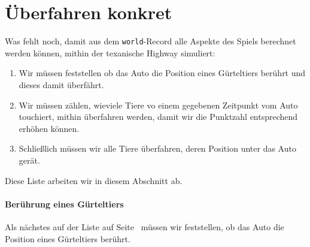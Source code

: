 \section{Überfahren konkret}
  
Was fehlt noch, damit aus dem
\lstinline{world}-Record alle Aspekte des Spiels berechnet werden
können, mithin der texanische Highway simuliert:\label{page:dillo-world-todos}
%
\begin{enumerate}
\item Wir müssen feststellen ob das Auto die Position eines
  Gürteltiers berührt und dieses damit überfährt.
\item Wir müssen zählen, wieviele Tiere vo einem gegebenen
  Zeitpunkt vom Auto touchiert, mithin überfahren werden, damit wir
  die Punktzahl entsprechend erhöhen können.
\item Schließlich müssen wir alle Tiere überfahren, deren Position
  unter das Auto gerät.
\end{enumerate}
%
Diese Liste arbeiten wir in diesem Abschnitt ab.
%
\paragraph{Berührung eines Gürteltiers} Als nächstes auf der Liste auf
Seite~\pageref{page:dillo-world-todos} müssen wir feststellen, ob das
Auto die Position eines Gürteltiers berührt.

